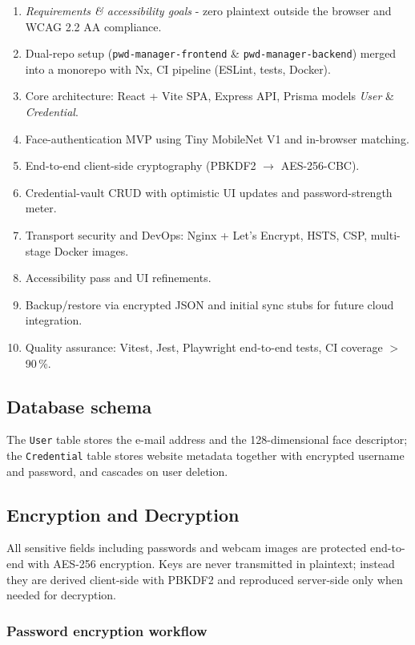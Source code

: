\begin{enumerate}[label=\textbf{Phase~\arabic*:}, leftmargin=2.5em]
  \item \emph{Requirements \& accessibility goals} - zero plaintext outside the browser and WCAG 2.2 AA compliance.%
  \item Dual-repo setup (\texttt{pwd-manager-frontend} \& \texttt{pwd-manager-backend}) merged into a monorepo with Nx, CI pipeline (ESLint, tests, Docker).%
  \item Core architecture: React + Vite SPA, Express API, Prisma models \emph{User} \& \emph{Credential}.%
  \item Face-authentication MVP using Tiny MobileNet V1 and in-browser matching.%
  \item End-to-end client-side cryptography (PBKDF2 $\rightarrow$ AES-256-CBC).%
  \item Credential-vault CRUD with optimistic UI updates and password-strength meter.%
  \item Transport security and DevOps: Nginx + Let's Encrypt, HSTS, CSP, multi-stage Docker images.%
  \item Accessibility pass and UI refinements.%
  \item Backup/restore via encrypted JSON and initial sync stubs for future cloud integration.%
  \item Quality assurance: Vitest, Jest, Playwright end-to-end tests, CI coverage $>$90\,\%.%
\end{enumerate}


\subsection{Database schema}
The \texttt{User} table stores the e-mail address and the 128-dimensional face descriptor; the \texttt{Credential} table stores website metadata together with encrypted username and password, and cascades on user deletion.


\subsection{Encryption and Decryption}\label{subsec:encryption}

All sensitive fields including passwords and webcam images are protected end-to-end with AES-256 encryption.
Keys are never transmitted in plaintext; instead they are derived client-side with PBKDF2 and reproduced server-side only when needed for decryption.

\subsubsection{Password encryption workflow}

